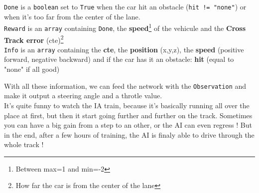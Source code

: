 \texttt{Done} is a \texttt{boolean} set to \texttt{True} when the car hit an obstacle (\texttt{hit != "none"}) or when it's too far from the center of the lane.\\

\texttt{Reward} is an \texttt{array} containing \texttt{Done}, the \textbf{speed}\footnote{Between max=1 and min=-2} of the vehicule and the \textbf{Cross Track error} (cte)\footnote{How far the car is from the center of the lane}\\

\texttt{Info} is an \texttt{array} containing the \textbf{cte}, the \textbf{position} (x,y,z), the \textbf{speed} (positive forward, negative backward) and if the car has it an obstacle: \textbf{hit}  (equal to "none" if all good)\cite{DonkeySim}

With all these information, we can feed the network with the \texttt{Observation} and make it output a steering angle and a throtle value.\\

It's quite funny to watch the IA train, because it's basically running all over the place at first, but then it start going further and further on the track. Sometimes you can have a big gain from a step to an other, or the AI can even regress ! But in the end, after a few hours of training, the AI is finaly able to drive through the whole track !

